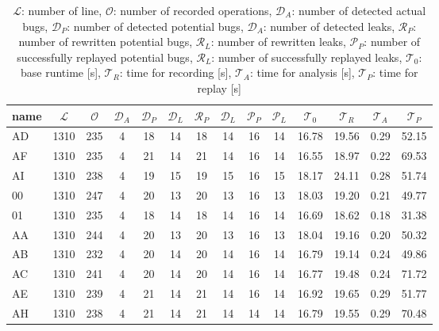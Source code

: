 \begin{table}[h]
\begin{tabular}{|l|c|c|c|c|c|c|c|c|c|c|c|c|c|}
\hline
name  & $\mathcal{L}$ & $\mathcal{O}$ & $\mathcal{D}_A$ & $\mathcal{D}_P$ & $\mathcal{D}_L$ & $\mathcal{R}_P$ & $\mathcal{D}_L$ & $\mathcal{P}_P$ & $\mathcal{P}_L$ & $\mathcal{T}_0$ & $\mathcal{T}_R$ & $\mathcal{T}_A$ & $\mathcal{T}_P$ \\ \hline
AD & 1310 & 235 & 4 & 18 & 14 & 18 & 14 & 16 & 14 & 16.78 & 19.56 & 0.29 & 52.15 \\ \hline
AF & 1310 & 235 & 4 & 21 & 14 & 21 & 14 & 16 & 14 & 16.55 & 18.97 & 0.22 & 69.53 \\ \hline
AI & 1310 & 238 & 4 & 19 & 15 & 19 & 15 & 16 & 15 & 18.17 & 24.11 & 0.28 & 51.74 \\ \hline
00 & 1310 & 247 & 4 & 20 & 13 & 20 & 13 & 16 & 13 & 18.03 & 19.20 & 0.21 & 49.77 \\ \hline
01 & 1310 & 235 & 4 & 18 & 14 & 18 & 14 & 16 & 14 & 16.69 & 18.62 & 0.18 & 31.38 \\ \hline
AA & 1310 & 244 & 4 & 20 & 13 & 20 & 13 & 16 & 13 & 18.04 & 19.16 & 0.20 & 50.32 \\ \hline
AB & 1310 & 232 & 4 & 20 & 14 & 20 & 14 & 16 & 14 & 16.79 & 19.14 & 0.24 & 49.86 \\ \hline
AC & 1310 & 241 & 4 & 20 & 14 & 20 & 14 & 16 & 14 & 16.77 & 19.48 & 0.24 & 71.72 \\ \hline
AE & 1310 & 239 & 4 & 21 & 14 & 21 & 14 & 16 & 14 & 16.92 & 19.65 & 0.29 & 51.77 \\ \hline
AH & 1310 & 238 & 4 & 21 & 14 & 21 & 14 & 14 & 14 & 16.79 & 19.55 & 0.29 & 70.48 \\ \hline
\end{tabular}
\caption{$\mathcal{L}$: number of line, $\mathcal{O}$: number of recorded operations, $\mathcal{D}_A$: number of detected actual bugs, $\mathcal{D}_P$: number of detected potential bugs, $\mathcal{D}_A$: number of detected leaks, $\mathcal{R}_P$: number of rewritten potential bugs, $\mathcal{R}_L$: number of rewritten leaks, $\mathcal{P}_P$: number of successfully replayed potential bugs, $\mathcal{R}_L$: number of successfully replayed leaks, $\mathcal{T}_0$: base runtime [s], $\mathcal{T}_R$: time for recording [s], $\mathcal{T}_A$: time for analysis [s], $\mathcal{T}_P$: time for replay [s]}
\label{}
\end{table}